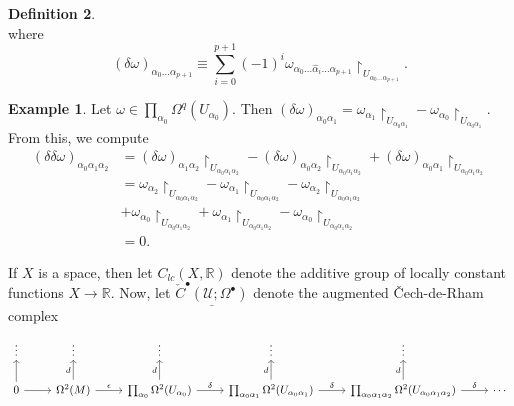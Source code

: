 \documentclass[10pt,letterpaper,cm]{nupset}
\theoremstyle{definition}
\newtheorem{definition}{Definition}[subsection]
\newtheorem{exmp}[definition]{Example}
\theoremstyle{theorem}
\theoremstyle{remark}
\newcommand{\U}{\mathcal U}
\newcommand{\R}{\mathbb{R}}
\newcommand{\1}{\mathbb{1}}
\newcommand{\0}{\vec 0}
\begin{document}
\begin{definition}
\[\] where  $$(\delta{\omega})_{\alpha_0 \ldots \alpha_{p+1}} \equiv \sum_{i=0}^{p+1}({-}1)^i\omega_{\alpha_0\ldots \hat{\alpha}_i\ldots \alpha_{p+1}} \restriction_{U_{\alpha_0 \ldots \alpha_{p+1}}}  .$$
\begin{exmp}
Let $\omega \in \prod_{\alpha_0} \Omega^q (U_{\alpha_0})$. Then $(\delta{\omega})_{\alpha_0{\alpha_1}} =\omega_{\alpha_1}\restriction_{U_{\alpha_0{\alpha_1}}} -\omega_{\alpha_0}\restriction_{U_{\alpha_0{\alpha_1}}}$. From this, we compute 
\begin{align*}
(\delta{\delta{\omega}})_{\alpha_0{\alpha_1}{\alpha_2}} & = (\delta{\omega})_{\alpha_1{\alpha_2}} \restriction_{U_{{\alpha_0}{\alpha_1}{\alpha_2}}} -  (\delta{\omega})_{\alpha_0{\alpha_2}} \restriction_{U_{{\alpha_0}{\alpha_1}{\alpha_2}}} +  (\delta{\omega})_{\alpha_0{\alpha_1}} \restriction_{U_{{\alpha_0}{\alpha_1}{\alpha_2}}}
\\ & = \omega_{\alpha_2} \restriction_{U_{{\alpha_0}{\alpha_1}{\alpha_2}}}  - \omega_{\alpha_1} \restriction_{U_{{\alpha_0}{\alpha_1}{\alpha_2}}} - \omega_{\alpha_2} \restriction_{U_{{\alpha_0}{\alpha_1}{\alpha_2}}} 
\\ & + \omega_{\alpha_0}  \restriction_{U_{{\alpha_0}{\alpha_1}{\alpha_2}}} + \omega_{\alpha_1} \restriction_{U_{{\alpha_0}{\alpha_1}{\alpha_2}}} - \omega_{\alpha_0} \restriction_{U_{{\alpha_0}{\alpha_1}{\alpha_2}}} 
\\ & = 0.
\end{align*}
\end{exmp}
\newpage
If $X$ is a space, then let $C_{lc}(X, \R)$ denote the additive group of locally constant functions $X \to \R$. Now, let  $\underline{\check{C}^{\bullet}(\U; \Omega^{\bullet})}$ denote the augmented \v{C}ech-de-Rham complex
\[
\begin{tikzcd}
\vdots                & \vdots                                           & \vdots                                                                    & \vdots                                                                                        & \vdots                                                                                                            &        \\
0 \arrow[r] \arrow[u] & \Omega^2(M) \arrow[r, "\epsilon"] \arrow[u, "d"] & \prod_{\alpha_0}\Omega^2(U_{\alpha_0}) \arrow[u, "d"] \arrow[r, "\delta"] & \prod_{\alpha_0{\alpha_1}}\Omega^2(U_{\alpha_0{\alpha_1}}) \arrow[u, "d"] \arrow[r, "\delta"] & \prod_{\alpha_0{\alpha_1{\alpha_2}}}\Omega^2(U_{\alpha_0{\alpha_1{\alpha_2}}}) \arrow[u, "d"] \arrow[r, "\delta"] & \cdots \\

\end{tikzcd}\]
\end{definition}
\end{document}
